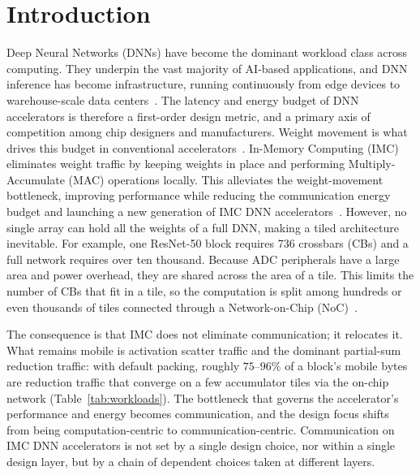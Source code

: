 \section{Introduction}
\label{sec:intro}
Deep Neural Networks (DNNs) have become the dominant workload class across computing. They underpin the vast majority of AI-based applications, and DNN inference has become infrastructure, running continuously from edge devices to warehouse-scale data centers~\cite{jouppiInDatacenterPerformanceAnalysis2017}. The latency and energy budget of DNN accelerators is therefore a first-order design metric, and a primary axis of competition among chip designers and manufacturers. Weight movement is what drives this budget in conventional accelerators~\cite{horowitz11ComputingsEnergy2014,szeEfficientProcessingDeep2017}. In-Memory Computing (IMC) eliminates weight traffic by keeping weights in place and performing Multiply-Accumulate (MAC) operations locally. This alleviates the weight-movement bottleneck, improving performance while reducing the communication energy budget and launching a new generation of IMC DNN accelerators~\cite{sebastianMemoryDevicesApplications2020,shafieeISAACConvolutionalNeural2016,chiPRIMENovelProcessinginMemory2016}. However, no single array can hold all the weights of a full DNN, making a tiled architecture inevitable. For example, one ResNet-50 block requires 736 crossbars (CBs) and a full network requires over ten thousand. Because ADC peripherals have a large area and power overhead, they are shared across the area of a tile. This limits the number of CBs that fit in a tile, so the computation is split among hundreds or even thousands of tiles connected through a Network-on-Chip (NoC)~\cite{shafieeISAACConvolutionalNeural2016}. 


The consequence is that IMC does not eliminate communication; it relocates it. What remains mobile is activation scatter traffic and the dominant partial-sum reduction traffic: with default packing, roughly $75$--$96\%$ of a block's mobile bytes are reduction traffic that converge on a few accumulator tiles via the on-chip network (Table~\ref{tab:workloads}). The bottleneck that governs the accelerator's performance and energy becomes communication, and the design focus shifts from being computation-centric to communication-centric. Communication on IMC DNN accelerators is not set by a single design choice, nor within a single design layer, but by a chain of dependent choices taken at different layers.

